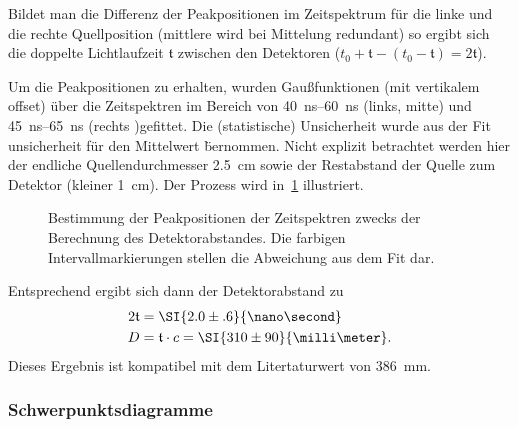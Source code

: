 \documentclass[slug=PET, room=Andreas-Schubert-Bau\,\ 424A,
supervisor=Carsten\ Bittrich, coursedate=10.\ 01.\ 2020, ngerman]{../../Lab_Report_LaTeX/lab_report}
\begin{document}
Bildet man die Differenz der Peakpositionen im Zeitspektrum f\"ur die
linke und die rechte Quellposition (mittlere wird bei Mittelung
redundant) so ergibt sich die doppelte Lichtlaufzeit \(\mathfrak{t}\)
zwischen den Detektoren
(\(t_0 + \mathfrak{t} - (t_0 - \mathfrak{t}) = 2\mathfrak{t}\)).

Um die Peakpositionen zu erhalten, wurden Gaußfunktionen (mit
vertikalem offset) \"uber die Zeitspektren im Bereich von
\SIrange{40}{60}{\nano\second} (links, mitte) und
\SIrange{45}{65}{\nano\second} (rechts )gefittet. Die (statistische)
Unsicherheit wurde aus der Fit unsicherheit f\"ur den Mittelwert
\"bernommen. Nicht explizit betrachtet werden hier der endliche
Quellendurchmesser \SI{2.5}{\centi\meter} sowie der Restabstand der
Quelle zum Detektor (kleiner \SI{1}{\centi\meter}). Der Prozess wird
in~\ref{fig:calibration-lenght_det} illustriert.

\begin{figure}[htb]\centering
  
  \caption[Abstandsbestimmung]{Bestimmung der Peakpositionen der Zeitspektren zwecks der
    Berechnung des Detektorabstandes. Die farbigen Intervallmarkierungen
    stellen die Abweichung aus dem Fit dar.}
  \label{fig:calibration-lenght_det}
\end{figure}

Entsprechend ergibt sich dann der Detektorabstand zu
\begin{align}
  \label{eq:abst}
  2\mathfrak{t} &= \SI{2.0\pm .6}{\nano\second} \\
  D &= \mathfrak{t}\cdot c = \SI{310\pm 90}{\milli\meter}.
\end{align}
Dieses Ergebnis ist kompatibel mit dem Litertaturwert von
\SI{386}{\milli\meter}.

\subsubsection{Schwerpunktsdiagramme}
\label{sec:schwpkt}
\end{document}
